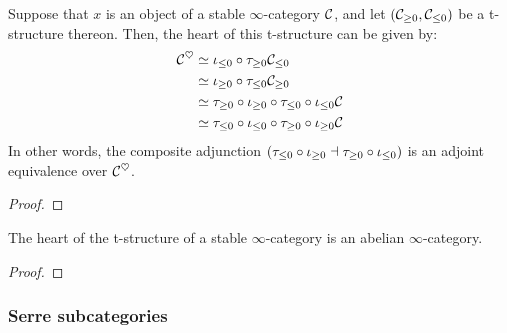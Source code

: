                 \begin{corollary} \label{coro: short_exact_sequences_and_truncations}
                    Suppose that $x$ is an object of a stable $\infty$-category $\mathcal{C}$, and let $(\mathcal{C}_{\geq 0}, \mathcal{C}_{\leq 0})$ be a t-structure thereon. Then, the heart of this t-structure can be given by:
                        $$
                            \begin{aligned}
                                \mathcal{C}^{\heartsuit} & \simeq \iota_{\leq 0} \circ \tau_{\geq 0} \mathcal{C}_{\leq 0}
                                \\
                                & \simeq \iota_{\geq 0} \circ \tau_{\leq 0} \mathcal{C}_{\geq 0} 
                                \\
                                & \simeq \tau_{\geq 0} \circ \iota_{\geq 0} \circ \tau_{\leq 0} \circ \iota_{\leq 0} \mathcal{C} 
                                \\
                                & \simeq \tau_{\leq 0} \circ \iota_{\leq 0} \circ \tau_{\geq 0} \circ \iota_{\geq 0} \mathcal{C}
                            \end{aligned}
                        $$
                    In other words, the composite adjunction $(\tau_{\leq 0} \circ \iota_{\geq 0} \dashv \tau_{\geq 0} \circ \iota_{\leq 0})$ is an adjoint equivalence over $\mathcal{C}^{\heartsuit}$. 
                \end{corollary}
                    \begin{proof}
                        
                    \end{proof}
                
                \begin{theorem} \label{theorem: hearts_are_abelian} 
                    The heart of the t-structure of a stable $\infty$-category is an abelian $\infty$-category.
                \end{theorem}
                    \begin{proof}
                        
                    \end{proof}
                    
            \subsubsection{Serre subcategories}
        

